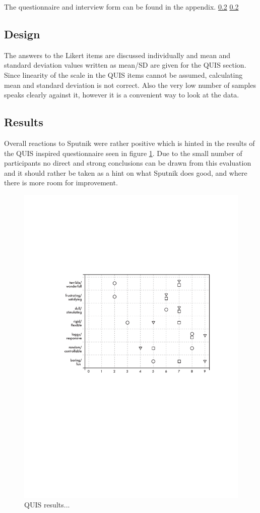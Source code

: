 \documentclass[10pt,a4paper]{scrartcl}
\begin{document}
The questionnaire and interview form can be found in the appendix. \ref{} \ref{}


\subsection{Design}
The answers to the Likert items are discussed individually and mean and standard deviation values written as mean/SD are given for the QUIS section. Since linearity of the scale in the QUIS items cannot be assumed, calculating mean and standard deviation is not correct. Also the very low number of samples speaks clearly against it, however it is a convenient way to look at the data.



\subsection{Results}
Overall reactions to Sputnik were rather positive which is hinted in the results of the QUIS inspired questionnaire seen in figure \ref{fig:QUIS}. Due to the small number of participants no direct and strong conclusions can be drawn from this evaluation and it should rather be taken as a hint on what Sputnik does good, and where there is more room for improvement.

\begin{figure}[hbtp]
\begin{center}
\includegraphics[width = 0.8 \columnwidth]{img/stripchart}
\caption{QUIS results...}
\label{fig:QUIS}
\end{center}
\end{figure}
\end{document}
